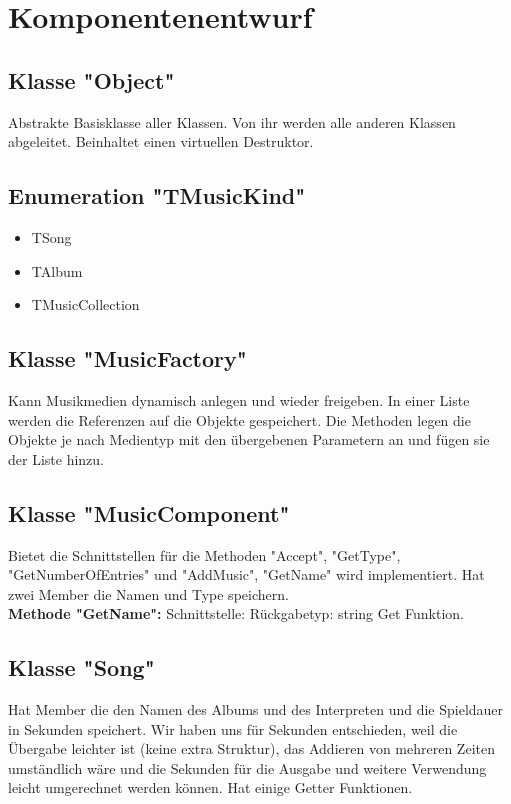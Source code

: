 \documentclass[12pt,a4paper]{article}
\begin{document}
\newpage
\section {Komponentenentwurf}
\subsection {Klasse "Object"}
Abstrakte Basisklasse aller Klassen. Von ihr werden alle anderen Klassen abgeleitet. Beinhaltet einen virtuellen Destruktor.

\subsection {Enumeration "TMusicKind"}
\begin {itemize}
	\item TSong
	\item TAlbum
	\item TMusicCollection	
\end {itemize}


\subsection {Klasse "MusicFactory"}
Kann Musikmedien dynamisch anlegen und wieder freigeben. In einer Liste werden die Referenzen auf die Objekte gespeichert. Die Methoden legen die Objekte je nach Medientyp mit den übergebenen Parametern an und fügen sie der Liste hinzu.
\\

\subsection {Klasse "MusicComponent"}
Bietet die Schnittstellen für die Methoden "Accept", "GetType", "GetNumberOfEntries" und "AddMusic", "GetName" wird implementiert. Hat zwei Member die Namen und Type speichern.
\\

\textbf {Methode "GetName": } 
\newline
Schnittstelle:
\newline
Rückgabetyp: string
\newline
Get Funktion.
\\

\subsection {Klasse "Song"}
Hat Member die den Namen des Albums und des Interpreten und die Spieldauer in Sekunden speichert. Wir haben uns für Sekunden entschieden, weil die Übergabe leichter ist (keine extra Struktur), das Addieren von mehreren Zeiten umständlich wäre und die Sekunden für die Ausgabe und weitere Verwendung leicht umgerechnet werden können. Hat einige Getter Funktionen.
\\
\end{document}
